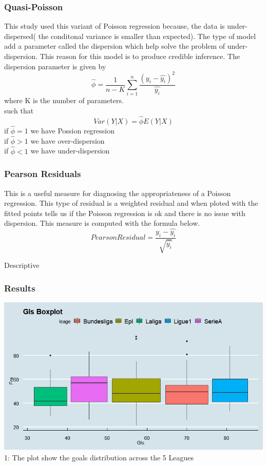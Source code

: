 \documentclass[11pt]{beamer}
\begin{document}
\begin{frame}
	\frametitle{Quasi-Poisson}
	This study used this variant of Poisson regression because, the data is under-dispersed( the conditonal variance is smaller than expected).
	The type of model add a parameter called the dispersion which help solve the problem of under-dispersion. This reason for this model is to produce credible inference. 
	The dispersion parameter is given by
	\[\hat{\phi}=\frac{1}{n-K}\sum_{i=1}^{n}\frac{(y_i-\hat{y_i})^2}{\hat{y_i}}\]
	where K is the number of parameters.\\
	such that
	\[Var(Y|X)=\hat{\phi}E(Y|X) \]
	if $\hat{\phi}=1$ we have Possion regression\\
	if $\hat{\phi}>1$ we have over-dispersion\\
	if $\hat{\phi}<1$ we have under-dispersion
	
\end{frame}
\begin{frame}
	\frametitle{Pearson Residuals}
	This is a useful measure for diagnosing the appropriateness of a Poisson regression. This type of residual is a weighted residual and when ploted with the fitted points tells us if the Poisson regression is ok and there is no issue with dispersion. This measure is computed with the formula below.
	\[Pearson Residual=\frac{y_i-\hat{y_i}}{\sqrt{\hat{y_i}}}\]  
\end{frame}

\begin{frame}{Descriptive}
	\frametitle{Results}
	\includegraphics[scale=0.5]{Gls}
	\figurename 1: The plot show the goals distribution across the 5 Leagues
\end{frame}
\end{document}
